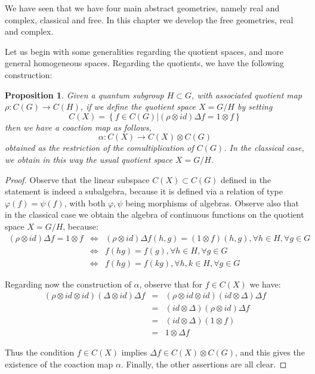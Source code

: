\documentclass[12pt]{amsbook}
\newtheorem{proposition}[theorem]{Proposition}
\begin{document}
We have seen that we have four main abstract geometries, namely real and complex, classical and free. In this chapter we develop the free geometries, real and complex.

\bigskip

Let us begin with some generalities regarding the quotient spaces, and more general homogeneous spaces. Regarding the quotients, we have the following construction:


\begin{proposition}
Given a quantum subgroup $H\subset G$, with associated quotient map $\rho:C(G)\to C(H)$, if we define the quotient space $X=G/H$ by setting
$$C(X)=\left\{f\in C(G)\Big|(\rho\otimes id)\Delta f=1\otimes f\right\}$$
then we have a coaction map as follows,
$$\alpha:C(X)\to C(X)\otimes C(G)$$
obtained as the restriction of the comultiplication of $C(G)$. In the classical case, we obtain in this way the usual quotient space $X=G/H$.
\end{proposition}

\begin{proof}
Observe that the linear subspace $C(X)\subset C(G)$ defined in the statement is indeed a subalgebra, because it is defined via a relation of type $\varphi(f)=\psi(f)$, with both $\varphi,\psi$ being morphisms of algebras. Observe also that in the classical case we obtain the algebra of continuous functions on the quotient space $X=G/H$, because:
\begin{eqnarray*}
(\rho\otimes id)\Delta f=1\otimes f
&\iff&(\rho\otimes id)\Delta f(h,g)=(1\otimes f)(h,g),\forall h\in H,\forall g\in G\\
&\iff&f(hg)=f(g),\forall h\in H,\forall g\in G\\
&\iff&f(hg)=f(kg),\forall h,k\in H,\forall g\in G
\end{eqnarray*}

Regarding now the construction of $\alpha$, observe that for $f\in C(X)$ we have: 
\begin{eqnarray*}
(\rho\otimes id\otimes id)(\Delta\otimes id)\Delta f
&=&(\rho\otimes id\otimes id)(id\otimes\Delta)\Delta f\\
&=&(id\otimes\Delta)(\rho\otimes id)\Delta f\\
&=&(id\otimes\Delta)(1\otimes f)\\
&=&1\otimes\Delta f
\end{eqnarray*}

Thus the condition $f\in C(X)$ implies $\Delta f\in C(X)\otimes C(G)$, and this gives the existence of the coaction map $\alpha$. Finally, the other assertions are all clear.
\end{proof}
\end{document}
